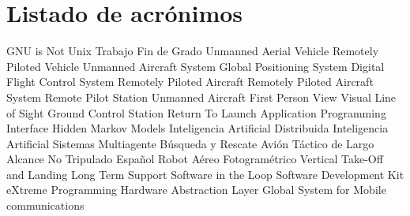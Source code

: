 \chapter{Listado de acrónimos}

{\small
\begin{acronym}[TFG]
       {\acs{GNU} is Not Unix}
       {Trabajo Fin de Grado}
       {Unmanned Aerial Vehicle}
       {Remotely Piloted Vehicle}
       {Unmanned Aircraft System}
       {Global Positioning System}
      {Digital Flight Control System}
       {Remotely Piloted Aircraft}
      {Remotely Piloted Aircraft System}
       {Remote Pilot Station}
        {Unmanned Aircraft} 
       {First Person View}
      {Visual Line of Sight} 
       {Ground Control Station}
       {Return To Launch}
       {Application Programming Interface}
       {Hidden Markov Models}
       {Inteligencia Artificial Distribuida}
  	 {Inteligencia Artificial}
  	 {Sistemas Multiagente}
       {Búsqueda y Rescate}
   {Avión Táctico de Largo Alcance No Tripulado Español}
  	 {Robot Aéreo Fotogramétrico}
  	 {Vertical Take-Off and Landing}
  	 {Long Term Support}
  	 {Software in the Loop}
  	 {Software Development Kit}
  	 {eXtreme Programming}
  	 {Hardware Abstraction Layer}
  	 {Global System for Mobile communications}
\end{acronym}
}




